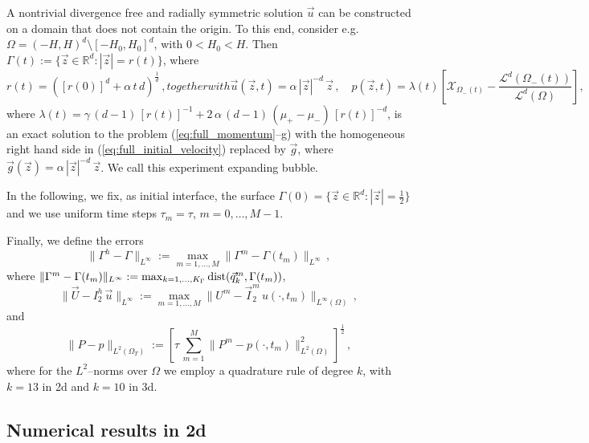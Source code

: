 \documentclass[a4paper,12pt,onecolumn]{article}
\newcommand{\R}{{\mathbb R}}
\newcommand{\bigchi}{\ensuremath{\mathrm{\mathcal{X}}}}
\newcommand{\charfcn}[1]{\bigchi_{#1}} %
\newcommand{\errorXx}{\|\Gamma^h - \Gamma\|_{L^\infty}}
\newcommand{\errorUu}[1]{\|\vec U - I^h_{#1}\,\vec u\|_{L^\infty}}
\newcommand{\LerrorPp}{\|P - p\|_{L^2(\Omega_T)}}
\begin{document}
A nontrivial divergence free and radially symmetric solution $\vec u$ can be
constructed on a domain that does not contain the origin. To this end, consider
e.g.\ $\Omega = (-H,H)^d \setminus [-H_0, H_0]^d$, with $0 < H_0 < H$. Then
$\Gamma(t) := \{ \vec z \in \R^d : |\vec z| = r(t)\}$, where
\begin{subequations}
\begin{equation} \label{eq:radialr2}
r(t) = ([r(0)]^d + \alpha\,t\,d)^\frac1d \,,
\end{equation}
together with
\begin{equation} \label{eq:radialup2}
\vec u(\vec z, t) = \alpha\,|\vec z|^{-d}\,\vec z \,, \quad p(\vec z, t) =
\lambda(t)\left[ \charfcn{\Omega_-(t)} -
\frac{\mathcal{L}^d(\Omega_-(t))}{\mathcal{L}^d(\Omega)}\right],
\end{equation}
\end{subequations}
where $\lambda(t) = \gamma\,(d-1)\,[r(t)]^{-1} + 2\,\alpha\,(d-1)\,(\mu_+ -
\mu_-)\,[r(t)]^{-d}$, is an exact solution to the problem
(\ref{eq:full_momentum}--g) with the homogeneous right hand side in
(\ref{eq:full_initial_velocity}) replaced by $\vec g$, where $\vec g(\vec z) =
\alpha\,|\vec z|^{-d}\,\vec z$. We call this experiment expanding bubble.

In the following, we fix, as initial interface, the surface $\Gamma(0) = \{
\vec z \in \R^d : |\vec z| = \frac12 \}$ and we use uniform time steps
$\tau_m=\tau$, $m=0,\ldots, M-1$.

Finally, we define the errors
\begin{equation} \label{eq:errorXx}
\errorXx := \max_{m=1,\ldots, M} \|\Gamma^m - \Gamma(t_m)\|_{L^\infty}\,,
\end{equation}
where $\|\Gamma^m - \Gamma(t_m)\|_{L^\infty} :=
\max_{k=1,\ldots, K_\Gamma} {\rm dist}( \vec{q}^m_k, \Gamma(t_m))$,
\begin{equation*}
\errorUu2 := \max_{m=1,\ldots, M}\|U^m - \vec
I^m_2\,u(\cdot,t_m)\|_{L^\infty(\Omega)}\,,
\end{equation*}
and
\begin{equation*}
\LerrorPp := \left[\tau\,\sum_{m=1}^M \|P^m - p(\cdot,t_m)\|_{L^2(\Omega)}^2
\right]^\frac12\,,
\end{equation*}
where for the $L^2$--norms over $\Omega$ we employ a quadrature rule of degree
$k$, with $k=13$ in 2d and $k=10$ in 3d.

\subsection{Numerical results in 2d} \label{subsec:numerical_results_2d}
\end{document}
